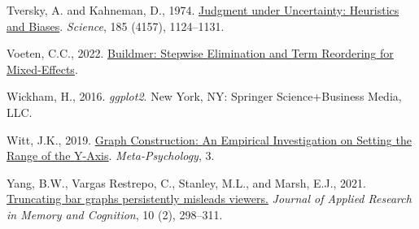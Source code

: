\documentclass[
]{interact}
\newlength{\cslhangindent}
\newlength{\cslentryspacingunit} %
\newenvironment{CSLReferences}[2] %
 {%
  \setlength{\parindent}{0pt}
  \ifodd #1
  \let\oldpar\par
  \def\par{\hangindent=\cslhangindent\oldpar}
  \fi
  \setlength{\parskip}{#2\cslentryspacingunit}
 }%
 {}
\begin{document}
\begin{CSLReferences}{1}{0}
\leavevmode{}%
Tversky, A. and Kahneman, D., 1974.
\href{https://doi.org/10.1126/science.185.4157.1124}{Judgment under
{Uncertainty}: {Heuristics} and {Biases}}. \emph{Science}, 185 (4157),
1124--1131.

\leavevmode{}%
Voeten, C.C., 2022.
\href{https://CRAN.R-project.org/package=buildmer}{Buildmer: {Stepwise}
{Elimination} and {Term} {Reordering} for {Mixed}-{Effects}}.

\leavevmode{}%
Wickham, H., 2016. \emph{ggplot2}. New York, NY: Springer
Science+Business Media, LLC.

\leavevmode{}%
Witt, J.K., 2019. \href{https://doi.org/10.15626/MP.2018.895}{Graph
{Construction}: {An} {Empirical} {Investigation} on {Setting} the
{Range} of the {Y}-{Axis}}. \emph{Meta-Psychology}, 3.

\leavevmode{}%
Yang, B.W., Vargas Restrepo, C., Stanley, M.L., and Marsh, E.J., 2021.
\href{https://doi.org/10.1016/j.jarmac.2020.10.002}{Truncating bar
graphs persistently misleads viewers.} \emph{Journal of Applied Research
in Memory and Cognition}, 10 (2), 298--311.

\end{CSLReferences}
\end{document}
